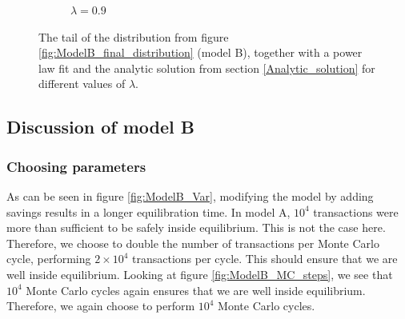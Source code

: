 \documentclass[a4paper, 10pt]{article}
\begin{document}
\begin{figure}[!ht]
\begin{subfigure}[H!]{0.5\textwidth}
        \caption{$\lambda = 0.9$}\label{fig:ModelB_tail_lamb_09}
    \end{subfigure}
\caption{The tail of the distribution from figure \ref{fig:ModelB_final_distribution} (model B), together with a power law fit and the analytic solution from section \ref{Analytic_solution} for different values of $\lambda$.}\label{fig:ModelB_tail}
\end{figure} 

\subsection{Discussion of model B}
\subsubsection{Choosing parameters}
As can be seen in figure \ref{fig:ModelB_Var}, modifying the model by adding savings results in a longer equilibration time. In model A, $10^4$ transactions were more than sufficient to be safely inside equilibrium. This is not the case here. Therefore, we choose to double the number of transactions per Monte Carlo cycle, performing $2\times 10^4$ transactions per cycle. This should ensure that we are well inside equilibrium. Looking at figure \ref{fig:ModelB_MC_steps}, we see that $10^4$ Monte Carlo cycles again ensures that we are well inside equilibrium. Therefore, we again choose to perform $10^4$ Monte Carlo cycles.
\newpage
\end{document}
